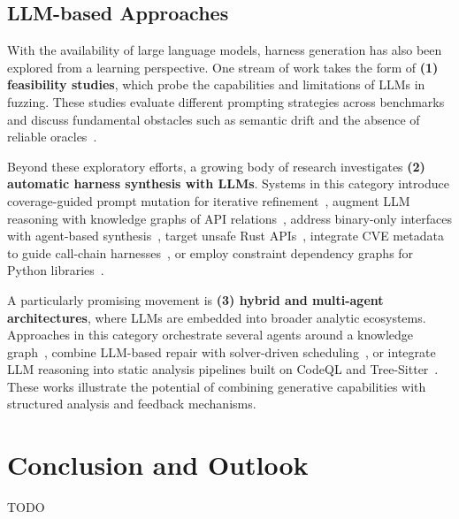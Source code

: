 \documentclass[sigconf,review,anonymous]{acmart}
\begin{document}
\subsection{LLM-based Approaches}
\label{subsec:llm-approaches}


With the availability of large language models, harness generation has also been explored from a learning perspective. One stream of work takes the form of \textbf{(1) feasibility studies}, which probe the capabilities and limitations of LLMs in fuzzing. These studies evaluate different prompting strategies across benchmarks~\cite{DBLP:conf/issta/ZhangZBLMXLSL24:HowEffectiveAreThey} and discuss fundamental obstacles such as semantic drift and the absence of reliable oracles~\cite{DBLP:conf/sigsoft/Jiang0MCZSWFWLZ24:WhenFuzzingMeetsLLMs}.

Beyond these exploratory efforts, a growing body of research investigates \textbf{(2) automatic harness synthesis with LLMs}. Systems in this category introduce coverage-guided prompt mutation for iterative refinement~\cite{DBLP:conf/ccs/LyuXCC24:PromptFuzz}, augment LLM reasoning with knowledge graphs of API relations~\cite{DBLP:conf/icse/XuMZZCHLW25:CKGFuzzer}, address binary-only interfaces with agent-based synthesis~\cite{DBLP:journals/corr/abs-2507-15058:LibLMFuzz}, target unsafe Rust APIs~\cite{DBLP:journals/corr/abs-2506-15648:deepSURF}, integrate CVE metadata to guide call-chain harnesses~\cite{DBLP:journals/corr/abs-2505-03425:HGFuzzer}, or employ constraint dependency graphs for Python libraries~\cite{DBLP:journals/cybersec/LiuLZZLL25:LLM4TDG}.

A particularly promising movement is \textbf{(3) hybrid and multi-agent architectures}, where LLMs are embedded into broader analytic ecosystems. Approaches in this category orchestrate several agents around a knowledge graph~\cite{DBLP:conf/icse/XuMZZCHLW25:CKGFuzzer}, combine LLM-based repair with solver-driven scheduling~\cite{DBLP:journals/corr/abs-2507-18289:Scheduzz}, or integrate LLM reasoning into static analysis pipelines built on CodeQL and Tree-Sitter~\cite{DBLP:journals/corr/abs-2505-03425:HGFuzzer}. These works illustrate the potential of combining generative capabilities with structured analysis and feedback mechanisms.


\section{Conclusion and Outlook}
TODO




\end{document}
